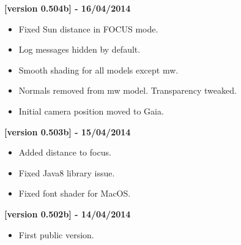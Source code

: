 \documentclass[
a4paper, %
11pt, %
onecolumn, %
openany, %
]{memoir}
\begin{document}
\textbf{[version 0.504b] - 16/04/2014}
\begin{itemize}
\item Fixed Sun distance in FOCUS mode.
\item Log messages hidden by default.
\item Smooth shading for all models except mw.
\item Normals removed from mw model. Transparency tweaked.
\item Initial camera position moved to Gaia.
\end{itemize}

\textbf{[version 0.503b] - 15/04/2014}
\begin{itemize}
\item Added distance to focus.
\item Fixed Java8 library issue.
\item Fixed font shader for MacOS.
\end{itemize}

\textbf{[version 0.502b] - 14/04/2014}
\begin{itemize}
\item First public version.
\end{itemize}
\end{document}
